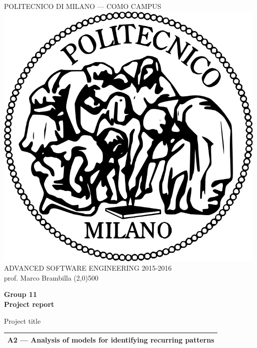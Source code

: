 \documentclass[a4paper,12pt,titlepage,fullpage]{article} %
\begin{document}
\begin{titlepage}

\begin{center}
	POLITECNICO DI MILANO --- COMO CAMPUS\\
	\vspace{10pt}
	\includegraphics[scale=0.1]{logo-polimi.png}\\
	\vspace{10pt}
	ADVANCED SOFTWARE ENGINEERING 2015-2016\\
	prof. Marco Brambilla
	\line(2,0){500}
\end{center}

\vspace{60pt}

\begin{center}
	{\Huge \textbf{Group 11}}\\
	{\Huge \textbf{Project report}}\\
\end{center}

\vspace{60pt}


\begin{center}
	{\large Project title}
\end{center}
\begin{tabularx}{\textwidth}{|X|}
	\hline
	A2 --- Analysis of models for identifying recurring patterns\\
	\hline
\end{tabularx}


\end{titlepage}
\end{document}
